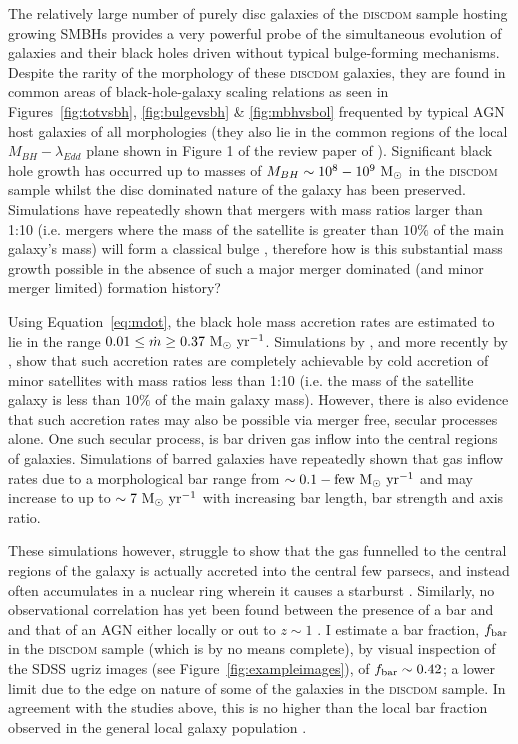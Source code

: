 {The relatively large number of purely disc galaxies of the \textsc{discdom} sample hosting growing SMBHs provides a very powerful probe of the simultaneous evolution of galaxies and their black holes driven without typical bulge-forming mechanisms. Despite the rarity of the morphology of these \textsc{discdom} galaxies, they are found in common areas of black-hole-galaxy scaling relations as seen in Figures~\ref{fig:totvsbh}, \ref{fig:bulgevsbh} \& \ref{fig:mbhvsbol} frequented by typical AGN host galaxies of all morphologies (they also lie in the common regions of the local $M_{BH}-\lambda_{Edd}$ plane shown in Figure 1 of the review paper of \citealt{alexander12}). Significant black hole growth has occurred up to masses of $M_{BH}\sim10^8 - 10^9~\rm{M}_{\odot}$ in the \textsc{discdom} sample whilst the disc dominated nature of the galaxy has been preserved. Simulations have repeatedly shown that mergers with mass ratios larger than 1:10 (i.e. mergers where the mass of the satellite is greater than $10\%$ of the main galaxy's mass) will form a classical bulge \citep{walker96, hopkins11, tonini16}, therefore how is this substantial mass growth possible in the absence of such a major merger dominated (and minor merger limited) formation history?

Using Equation~\ref{eq:mdot}, the black hole mass accretion rates are estimated to lie in the range $0.01 \leq \dot{m} \geq 0.37 ~\rm{M}_{\odot}~\rm{yr}^{-1}$. Simulations by \citet{crockett11}, and more recently by \citet{diteodoro14}, show that such accretion rates are completely achievable by cold accretion of minor satellites with mass ratios less than 1:10 (i.e. the mass of the satellite galaxy is less than $10\%$ of the main galaxy mass). However, there is also evidence that such accretion rates may also be possible via merger free, secular processes alone. One such secular process, is bar driven gas inflow into the central regions of galaxies. Simulations of barred galaxies have repeatedly shown that gas inflow rates due to a morphological bar range from $\sim0.1-\rm{few} ~\rm{M}_{\odot}~\rm{yr}^{-1}$ \citep{sakamoto96, maciejewski02, regan04, emsellem05, lin13} and may increase to up to $\sim 7 ~\rm{M}_{\odot}~\rm{yr}^{-1}$ \citep{friedli93} with increasing bar length, bar strength and axis ratio. 

These simulations however, struggle to show that the gas funnelled to the central regions of the galaxy is actually accreted into the central few parsecs, and instead often accumulates in a nuclear ring wherein it causes a starburst \citep{regan04}. Similarly, no observational correlation has yet been found between the presence of a bar and and that of an AGN either locally \citep{ho97, malkan98, erwin02, lee12,cisterns13} or out to $z\sim1$ \citep{cheung15}. I estimate a bar fraction, $f_{\rm{bar}}$ in the \textsc{discdom} sample (which is by no means complete), by visual inspection of the SDSS ugriz images (see Figure~\ref{fig:exampleimages}), of $f_{\rm{bar}} \sim 0.42$; a lower limit due to the edge on nature of some of the galaxies in the \textsc{discdom} sample. In agreement with the studies above, this is no higher than the local bar fraction observed in the general local galaxy population \citep{masters11a}.

}
